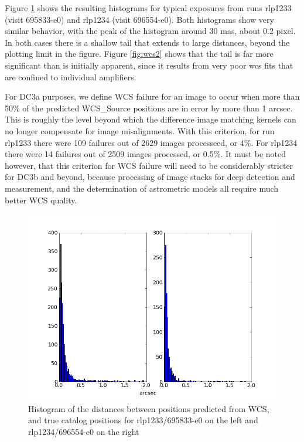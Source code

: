Figure \ref{fig:wcs1} shows the resulting histograms for typical
exposures from runs rlp1233 (visit 695833-e0) and rlp1234 (visit
696554-e0). Both histograms show very similar behavior, with the peak
of the histogram around 30 mas, about 0.2 pixel.  In both cases there
is a shallow tail that extends to large distances, beyond the plotting
limit in the figure.  Figure \ref{fig:wcs2} shows that the tail is
far more significant than is initially apparent, since it
results from very poor wcs fits that are confined to individual
amplifiers.

For DC3a purposes, we define WCS failure for an image to occur when
more than 50\% of the predicted WCS\_Source positions are in error by
more than 1 arcsec.  This is roughly the level beyond which the difference
image matching kernels can no longer compensate for image misalignments. With
this criterion, for run rlp1233 there were 109 failures out of 2629
images processeed, or 4\%.   For rlp1234 there were 14 failures out
of 2509 images processed, or 0.5\%.  It must be noted however, that this criterion for WCS failure will
need to be considerably stricter for DC3b and beyond, because
processing of image stacks for deep detection and measurement, and the
determination of astrometric models all require much better WCS quality.
\begin{figure}[htb]
\begin{center}
\includegraphics[width=6in]{images/rlp1233_1234_match.png}
\caption{Histogram of the distances between positions predicted from WCS, and
  true catalog positions for rlp1233/695833-e0 on the left and
  rlp1234/696554-e0 on the right}  
\label{fig:wcs1}
\end{center}
\end{figure}

